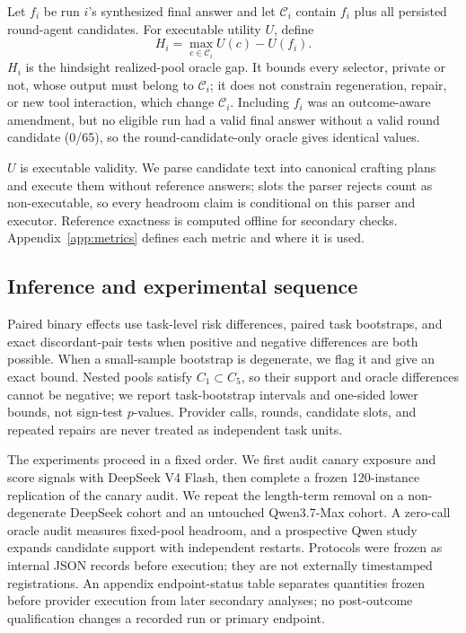\documentclass[11pt]{article}
\begin{document}
Let $f_i$ be run $i$'s synthesized final answer and let $\mathcal C_i$ contain $f_i$ plus all persisted round-agent candidates. For executable utility $U$, define
\[
H_i=\max_{c\in\mathcal C_i}U(c)-U(f_i).
\]
$H_i$ is the hindsight realized-pool oracle gap. It bounds every selector, private or not, whose output must belong to $\mathcal C_i$; it does not constrain regeneration, repair, or new tool interaction, which change $\mathcal C_i$. Including $f_i$ was an outcome-aware amendment, but no eligible run had a valid final answer without a valid round candidate (0/65), so the round-candidate-only oracle gives identical values.

$U$ is executable validity. We parse candidate text into canonical crafting plans and execute them without reference answers; slots the parser rejects count as non-executable, so every headroom claim is conditional on this parser and executor. Reference exactness is computed offline for secondary checks. Appendix~\ref{app:metrics} defines each metric and where it is used.

\subsection{Inference and experimental sequence}

Paired binary effects use task-level risk differences, paired task bootstraps, and exact discordant-pair tests when positive and negative differences are both possible. When a small-sample bootstrap is degenerate, we flag it and give an exact bound. Nested pools satisfy $C_1\subset C_5$, so their support and oracle differences cannot be negative; we report task-bootstrap intervals and one-sided lower bounds, not sign-test $p$-values. Provider calls, rounds, candidate slots, and repeated repairs are never treated as independent task units.

The experiments proceed in a fixed order. We first audit canary exposure and score signals with DeepSeek V4 Flash, then complete a frozen 120-instance replication of the canary audit. We repeat the length-term removal on a non-degenerate DeepSeek cohort and an untouched Qwen3.7-Max cohort. A zero-call oracle audit measures fixed-pool headroom, and a prospective Qwen study expands candidate support with independent restarts. Protocols were frozen as internal JSON records before execution; they are not externally timestamped registrations. An appendix endpoint-status table separates quantities frozen before provider execution from later secondary analyses; no post-outcome qualification changes a recorded run or primary endpoint.
\end{document}
